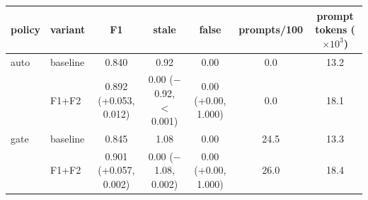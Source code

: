 \begin{tabular}{llccccc}
\toprule
policy & variant & F1 & stale & false & prompts/100 & prompt tokens ($\times10^3$) \\
\midrule
auto & baseline & 0.840 & 0.92 & 0.00 & 0.0 & 13.2 \\
 & F1+F2 & 0.892 (+0.053, 0.012) & 0.00 ($-$0.92, \ensuremath{<}0.001) & 0.00 (+0.00, 1.000) & 0.0 & 18.1 \\
\addlinespace[2pt]
gate & baseline & 0.845 & 1.08 & 0.00 & 24.5 & 13.3 \\
 & F1+F2 & 0.901 (+0.057, 0.002) & 0.00 ($-$1.08, 0.002) & 0.00 (+0.00, 1.000) & 26.0 & 18.4 \\
\bottomrule
\end{tabular}

